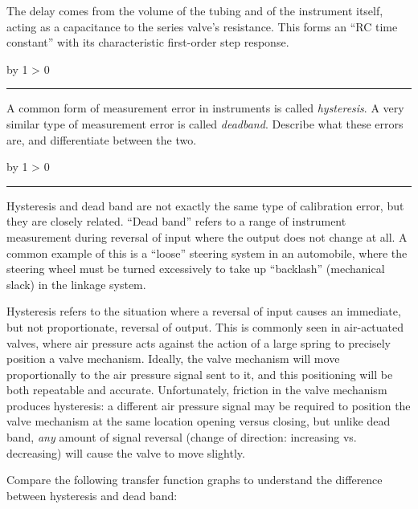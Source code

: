 \documentclass[12pt,a4paper]{article}
\def\oppgave{
            \advance\questnum by 1
            \ifnum \questnum > 0
                 \hrule
                 \vskip 3pt
                 \leftline{Oppgave \the\questnum}
                 \vskip 3pt \fi}
\def\svar{
           \advance\answnum by 1
           \ifnum \answnum > 0
                \hrule
                \vskip 3pt
                \leftline{Svar \the\answnum}
                \vskip 3pt \fi}
\begin{document}
The delay comes from the volume of the tubing and of the instrument itself, acting as a capacitance to the series valve's resistance.  This forms an ``RC time constant'' with its characteristic first-order step response.


\vfil \eject 



\oppgave{} 

A common form of measurement error in instruments is called {\it hysteresis}.  A very similar type of measurement error is called {\it deadband}.  Describe what these errors are, and differentiate between the two.

\vskip 10pt \filbreak 





\svar{} 

Hysteresis and dead band are not exactly the same type of calibration error, but they are closely related.  ``Dead band'' refers to a range of instrument measurement during reversal of input where the output does not change at all.  A common example of this is a ``loose'' steering system in an automobile, where the steering wheel must be turned excessively to take up ``backlash'' (mechanical slack) in the linkage system.  

Hysteresis refers to the situation where a reversal of input causes an immediate, but not proportionate, reversal of output.  This is commonly seen in air-actuated valves, where air pressure acts against the action of a large spring to precisely position a valve mechanism.  Ideally, the valve mechanism will move proportionally to the air pressure signal sent to it, and this positioning will be both repeatable and accurate.  Unfortunately, friction in the valve mechanism produces hysteresis: a different air pressure signal may be required to position the valve mechanism at the same location opening versus closing, but unlike dead band, {\it any} amount of signal reversal (change of direction: increasing vs. decreasing) will cause the valve to move slightly.

Compare the following transfer function graphs to understand the difference between hysteresis and dead band:
\end{document}
